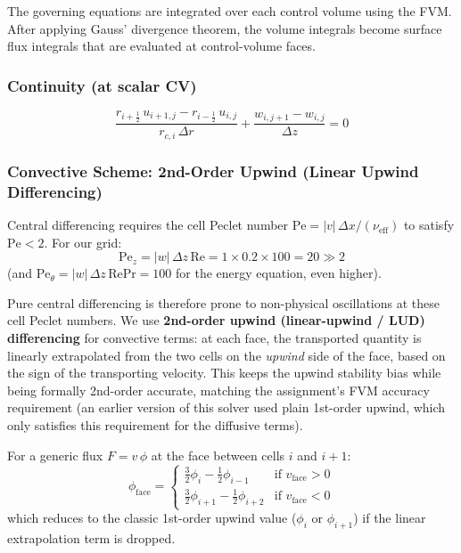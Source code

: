 \documentclass[12pt,a4paper]{article}
\newcommand{\Rey}{\text{Re}}
\newcommand{\Pran}{\text{Pr}}
\begin{document}
The governing equations are integrated over each control volume using the FVM.
After applying Gauss' divergence theorem, the volume integrals become surface flux integrals that are evaluated at control-volume faces.

\subsubsection{Continuity (at scalar CV)}

\begin{equation}
    \frac{r_{i+\frac{1}{2}}\,u_{i+1,j} - r_{i-\frac{1}{2}}\,u_{i,j}}{r_{c,i}\,\Delta r}
    + \frac{w_{i,j+1} - w_{i,j}}{\Delta z} = 0
    \label{eq:div_discrete}
\end{equation}

\subsubsection{Convective Scheme: 2nd-Order Upwind (Linear Upwind Differencing)}

Central differencing requires the cell Peclet number $\text{Pe} = |v|\,\Delta x / (\nu_{\text{eff}})$ to satisfy $\text{Pe} < 2$.
For our grid:
\begin{equation}
    \text{Pe}_z = |w|\,\Delta z\,\Rey = 1 \times 0.2 \times 100 = 20 \gg 2
\end{equation}
(and $\text{Pe}_\theta = |w|\,\Delta z\,\Rey\Pran = 100$ for the energy equation, even higher).

Pure central differencing is therefore prone to non-physical oscillations at these cell Peclet
numbers. We use \textbf{2nd-order upwind (linear-upwind / LUD) differencing} for convective
terms: at each face, the transported quantity is linearly extrapolated from the two cells on
the \textit{upwind} side of the face, based on the sign of the transporting velocity. This keeps
the upwind stability bias while being formally 2nd-order accurate, matching the assignment's
FVM accuracy requirement (an earlier version of this solver used plain 1st-order upwind, which
only satisfies this requirement for the diffusive terms).

For a generic flux $F = v\,\phi$ at the face between cells $i$ and $i+1$:
\begin{equation}
    \phi_{\text{face}} =
    \begin{cases}
        \tfrac{3}{2}\phi_i - \tfrac{1}{2}\phi_{i-1} & \text{if } v_{\text{face}} > 0 \\[4pt]
        \tfrac{3}{2}\phi_{i+1} - \tfrac{1}{2}\phi_{i+2} & \text{if } v_{\text{face}} < 0
    \end{cases}
\end{equation}
which reduces to the classic 1st-order upwind value ($\phi_i$ or $\phi_{i+1}$) if the linear
extrapolation term is dropped.
\end{document}
